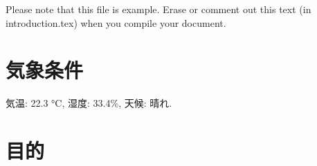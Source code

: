 Please note that this file is example.
Erase or comment out this text (in introduction.tex) when you compile your document.

\section{気象条件}
\label{sec:weather}
気温: 22.3 \si{\degreeCelsius},
湿度: 33.4\%,
天候: 晴れ.


\section{目的}
\label{sec:objective}

